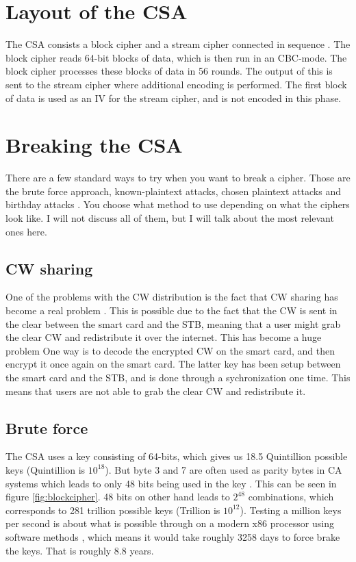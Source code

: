 \section{Layout of the CSA}
The CSA consists a block cipher and a stream cipher connected in sequence 
\citep[p. 271]{WeiLi:2007}. The block cipher reads 64-bit blocks of data, which 
is then run in an CBC-mode. The block cipher processes these blocks of data in 
56 rounds. The output of this is sent to the stream cipher where additional 
encoding is performed. The first block of data is used as an IV for the stream 
cipher, and is not encoded in this phase. \citep{DVBAnalysis:2006}

\section{Breaking the CSA}
There are a few standard ways to try when you want to break a cipher. 
Those are the brute force approach, known-plaintext attacks, chosen plaintext 
attacks and birthday attacks \citep[pp. 31-34]{Schneier:2003}. You choose what 
method to use depending on what the ciphers look like. I will not discuss all 
of them, but I will talk about the most relevant ones here.

\subsection{CW sharing}
One of the problems with the CW distribution is the fact that CW sharing has 
become a real problem \citep{Farncombe}. This is possible due to the fact that
the CW is sent in the clear between the smart card and the STB, meaning that a 
user might grab the clear CW and redistribute it over the internet. 
This has become a huge problem 
One way is to decode the encrypted CW on the smart card, and then encrypt it 
once again on the smart card. The latter key has been setup between the smart 
card and the STB, and is done through a sychronization one time. This means that 
users are not able to grab the clear CW and redistribute it. 
\citep[pp. 12--13]{HIS:2011} 

\subsection{Brute force}
The CSA uses a key consisting of 64-bits, which gives us 18.5 Quintillion 
possible keys (Quintillion is $10^{18}$). But byte 3 and 7 are often used as 
parity bytes in CA systems which leads to only 48 bits being used in the key 
\citep{Breaking:2012}. This can be seen in figure \ref{fig:blockcipher}. 48 bits 
on other hand leads to $2^{48}$ combinations, which corresponds to 281 trillion 
possible keys (Trillion is $10^{12}$). Testing a million keys per second is about 
what is possible through on a modern x86 processor using software methods
, which means it would take roughly 
3258 days to force brake the keys. That is roughly 8.8 years.

